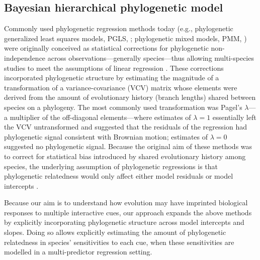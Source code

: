 \documentclass[11pt]{article}
\begin{document}
\subsection*{Bayesian hierarchical phylogenetic model}
Commonly used phylogenetic regression methods today (e.g., phylogenetic generalized least squares models, PGLS, \cite{freckleton2002phylogenetic}; phylogenetic mixed models, PMM, \cite{housworth2004phylogenetic}) were originally conceived as statistical corrections for phylogenetic non-independence across observations---generally species---thus allowing multi-species studies to meet the assumptions of linear regression \citep{freckleton2002phylogenetic}. These corrections incorporated phylogenetic structure by estimating the magnitude of a transformation of a variance-covariance (VCV) matrix whose elements were derived from the amount of evolutionary history (branch lengths) shared between species on a phylogeny. The most commonly used transformation was Pagel's $\lambda$---a multiplier of the off-diagonal elements---where estimates of $\lambda = 1$ essentially left the VCV untransformed and suggested that the residuals of the regression had phylogenetic signal consistent with Brownian motion; estimates of $\lambda = 0$ suggested no phylogenetic signal. %
Because the original aim of these methods was to correct for statistical bias introduced by shared evolutionary history among species, the underlying assumption of phylogenetic regressions is that phylogenetic relatedness would only affect either model residuals \citep[in PGLS approaches,][]{freckleton2002phylogenetic} or model intercepts \citep[e.g., in many PMM approaches,][]{housworth2004phylogenetic}.

Because our aim is to understand how evolution may have imprinted biological responses to multiple interactive cues, our approach expands the above methods by explicitly incorporating phylogenetic structure across model intercepts and slopes. Doing so allows explicitly estimating the amount of phylogenetic relatedness in species' sensitivities to each cue, when these sensitivities are modelled in a multi-predictor regression setting.  
\end{document}
